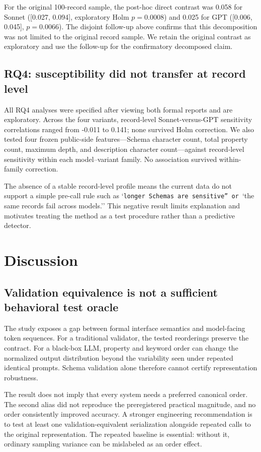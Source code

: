 \documentclass[10pt]{article}
\begin{document}
For the original 100-record sample, the post-hoc direct contrast was 0.058 for Sonnet ([0.027, 0.094], exploratory Holm \(p=0.0008\)) and 0.025 for GPT ([0.006, 0.045], \(p=0.0066\)). The disjoint follow-up above confirms that this decomposition was not limited to the original record sample. We retain the original contrast as exploratory and use the follow-up for the confirmatory decomposed claim.

\subsection{RQ4: susceptibility did not transfer at record level}
All RQ4 analyses were specified after viewing both formal reports and are exploratory. Across the four variants, record-level Sonnet-versus-GPT sensitivity correlations ranged from -0.011 to 0.141; none survived Holm correction. We also tested four frozen public-side features---Schema character count, total property count, maximum depth, and description character count---against record-level sensitivity within each model--variant family. No association survived within-family correction.

The absence of a stable record-level profile means the current data do not support a simple pre-call rule such as `\texttt{longer S\allowbreak{}chemas a\allowbreak{}re sensi\allowbreak{}tive'' o\allowbreak{}r }`the same records fail across models.'' This negative result limits explanation and motivates treating the method as a test procedure rather than a predictive detector.

\section{Discussion}
\subsection{Validation equivalence is not a sufficient behavioral test oracle}
The study exposes a gap between formal interface semantics and model-facing token sequences. For a traditional validator, the tested reorderings preserve the contract. For a black-box LLM, property and keyword order can change the normalized output distribution beyond the variability seen under repeated identical prompts. Schema validation alone therefore cannot certify representation robustness.

The result does not imply that every system needs a preferred canonical order. The second alias did not reproduce the preregistered practical magnitude, and no order consistently improved accuracy. A stronger engineering recommendation is to test at least one validation-equivalent serialization alongside repeated calls to the original representation. The repeated baseline is essential: without it, ordinary sampling variance can be mislabeled as an order effect.
\end{document}
